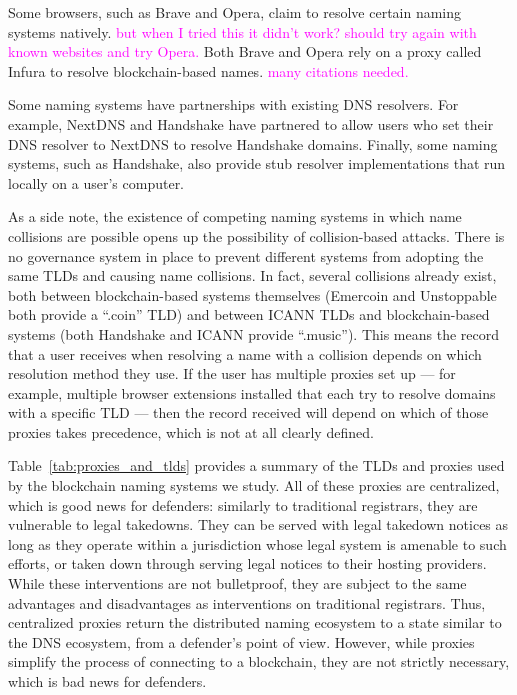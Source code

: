\documentclass[10pt,sigconf,letterpaper]{acmart}
\newcommand{\randall}{\ding{110}\ding{43}\textcolor{magenta}}
\newcommand{\randall}{}
\begin{document}
Some browsers, such as Brave and Opera, claim to resolve certain naming systems 
natively. \randall{but when I tried this it didn't work? should try again with 
known websites and try Opera.} Both Brave and Opera rely on a proxy called 
Infura to resolve blockchain-based names. \randall{many citations needed.} 

Some naming systems have partnerships with existing DNS resolvers. For example, 
NextDNS and Handshake have partnered to allow users who set their DNS resolver 
to NextDNS to resolve Handshake domains. Finally, some naming systems, such as 
Handshake, also provide stub resolver implementations that run locally on a 
user's computer. 

As a side note, the existence of competing naming systems in which name 
collisions are possible 
opens up the possibility of collision-based attacks. There is no governance 
system in place to prevent different systems from adopting the same TLDs and 
causing name collisions. In fact, several collisions already exist, both 
between blockchain-based systems themselves (Emercoin and Unstoppable both 
provide a ``.coin'' TLD) and between ICANN TLDs and blockchain-based systems 
(both Handshake and ICANN provide ``.music''). 
This means the record that a user receives when resolving a name with a 
collision depends on which resolution method they use. If the user has multiple 
proxies set up --- for example, multiple browser extensions installed that each 
try to resolve domains with a specific TLD --- then the record received will 
depend on which of those proxies takes precedence, which is not at all clearly 
defined. 

Table~\ref{tab:proxies_and_tlds} provides a summary of the TLDs and proxies 
used by the blockchain naming systems we study. All of these proxies are 
centralized, which is good news for defenders: similarly to traditional 
registrars, they are vulnerable to legal takedowns. They can be served with 
legal takedown notices as long as they operate within a jurisdiction whose 
legal system is amenable to such efforts, or taken down through serving legal 
notices to their hosting providers. While these interventions are not 
bulletproof, they are subject to the same advantages and disadvantages as 
interventions on traditional registrars. Thus, centralized proxies return the 
distributed naming ecosystem to a state similar to the DNS ecosystem, from a 
defender's point of view. However, while proxies simplify the process of 
connecting to a blockchain, they are not strictly necessary, which is bad news 
for defenders.
\end{document}
